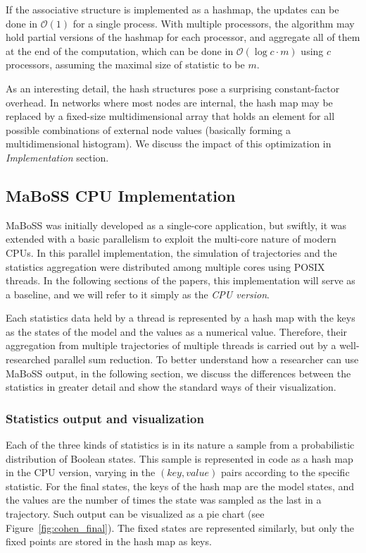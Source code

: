 \documentclass[sn-mathphys-num]{sn-jnl}%
\begin{document}
If the associative structure is implemented as a hashmap, the updates can be done in $\mathcal{O}(1)$ for a single process. With multiple processors, the algorithm may hold partial versions of the hashmap for each processor, and aggregate all of them at the end of the computation, which can be done in $\mathcal{O}(\log{c} \cdot m)$ using $c$ processors, assuming the maximal size of statistic to be $m$.

As an interesting detail, the hash structures pose a surprising constant-factor overhead. In networks where most nodes are internal, the hash map may be replaced by a fixed-size multidimensional array that holds an element for all possible combinations of external node values (basically forming a multidimensional histogram). We discuss the impact of this optimization in \emph{Implementation} section.

\subsection{MaBoSS CPU Implementation}

MaBoSS was initially developed as a single-core application, but swiftly, it was extended with a basic parallelism to exploit the multi-core nature of modern CPUs. In this parallel implementation, the simulation of trajectories and the statistics aggregation were distributed among multiple cores using POSIX threads. In the following sections of the papers, this implementation will serve as a baseline, and we will refer to it simply as the \emph{CPU version}. 

Each statistics data held by a thread is represented by a hash map with the keys as the states of the model and the values as a numerical value. Therefore, their aggregation from multiple trajectories of multiple threads is carried out by a well-researched parallel sum reduction. To better understand how a researcher can use MaBoSS output, in the following section, we discuss the differences between the statistics in greater detail and show the standard ways of their visualization.

\subsubsection{Statistics output and visualization}

Each of the three kinds of statistics is in its nature a sample from a probabilistic distribution of Boolean states. This sample is represented in code as a hash map in the CPU version, varying in the $(key, value)$ pairs according to the specific statistic. For the final states, the keys of the hash map are the model states, and the values are the number of times the state was sampled as the last in a trajectory. Such output can be visualized as a pie chart (see Figure~\ref{fig:cohen_final}). The fixed states are represented similarly, but only the fixed points are stored in the hash map as keys.
\end{document}
